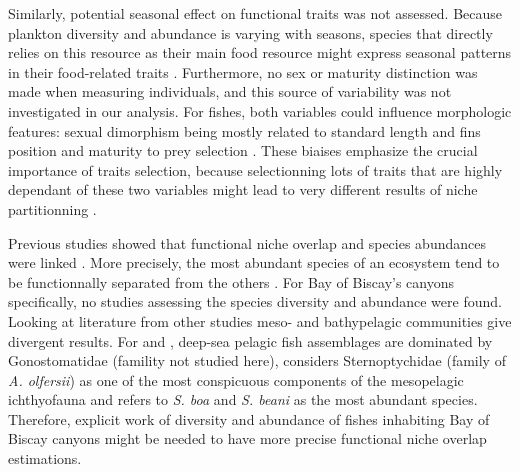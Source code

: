 Similarly, potential seasonal effect on functional traits was not assessed. Because plankton diversity and abundance is varying with seasons, species that directly relies on this resource as their main food resource might express seasonal patterns in their food-related traits \citep{kremer2017}. Furthermore, no sex or maturity distinction was made when measuring individuals, and this source of variability was not investigated in our analysis. For fishes, both variables could influence morphologic features: sexual dimorphism being mostly related to standard length and fins position and maturity to prey selection \citep{geidner2008,nagelkerke2018}. These biaises emphasize the crucial importance of traits selection, because selectionning lots of traits that are highly dependant of these two variables might lead to very different results of niche partitionning \citep{dasilva2019,dumay2004,nagelkerke2018}.

Previous studies showed that functional niche overlap and species abundances were linked \citep{aneeshkumar2017,mason2008}. More precisely, the most abundant species of an ecosystem tend to be functionnally separated from the others \citep{farre2016}. For Bay of Biscay's canyons specifically, no studies assessing the species diversity and abundance were found. Looking at literature from other studies meso- and bathypelagic communities give divergent results. For \citet{garcia2021} and \cite{kenchington2020}, deep-sea pelagic fish assemblages are dominated by Gonostomatidae (famility not studied here), \citet{eduardo2020} considers Sternoptychidae (family of \textit{A. olfersii}) as one of the most conspicuous components of the mesopelagic ichthyofauna and \citep{sutton2008} refers to \textit{S. boa} and \textit{S. beani} as the most abundant species. Therefore, explicit work of diversity and abundance of fishes inhabiting Bay of Biscay canyons might be needed to have more precise functional niche overlap estimations.

